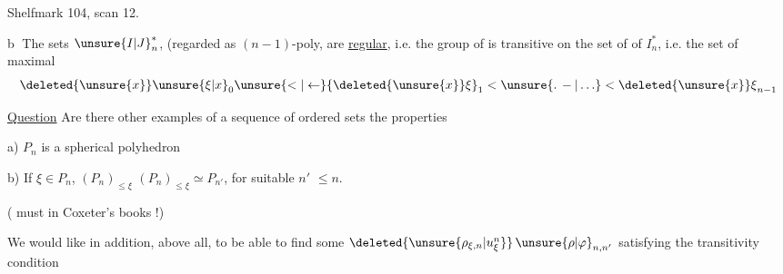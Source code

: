Shelfmark 104, scan 12.

\textcircled{b} The  sets $ {\unsure{I|J}}_n^*$, (regarded as $(n-1)$-poly, are \uline{regular}, i.e. the group of  is transitive on the set of  of $I_n^*$, i.e. the set of maximal 
\[
{\deleted{\unsure{x}}\unsure{\xi|x}}_0\unsure{<|\leftarrow}{\deleted{\unsure{x}}\xi}_1<\unsure{.\,-|\ldots}<{\deleted{\unsure{x}}\xi}_{n-1}
\]

\uline{Question} Are there other examples of a sequence    of ordered sets  the properties

a) $P_n$ is a \uline{} spherical polyhedron

b) If $\xi\in P_n$,   $(P_n)_{\leq\xi}$  $(P_n)_{\leq\xi}\simeq P_{n'}$, for suitable $n'$ $\leq n$.

( must  in Coxeter's books !)

We would like in addition, above all, to be able to find some $\deleted{\unsure{\rho_{\xi,n}|u^n_\xi}}\,{\unsure{\rho|\varphi}}_{n,n'}$ satisfying the transitivity condition
